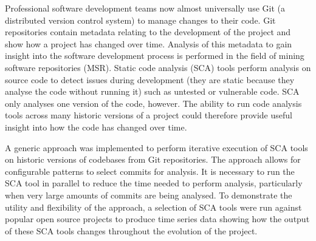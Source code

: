 Professional software development teams now almost universally use Git (a distributed version control system) to manage changes to their code.
Git repositories contain metadata relating to the development of the project and show how a project has changed over time.
Analysis of this metadata to gain insight into the software development process is performed in the field of mining software repositories (MSR).
Static code analysis (SCA) tools perform analysis on source code to detect issues during development (they are static because they analyse the code without running it) such as untested or vulnerable code.
SCA only analyses one version of the code, however.
The ability to run code analysis tools across many historic versions of a project could therefore provide useful insight into how the code has changed over time.

A generic approach was implemented to perform iterative execution of SCA tools on historic versions of codebases from Git repositories.
The approach allows for configurable patterns to select commits for analysis.
It is necessary to run the SCA tool in parallel to reduce the time needed to perform analysis, particularly when very large amounts of commits are being analysed.
To demonstrate the utility and flexibility of the approach, a selection of SCA tools were run against popular open source projects to produce time series data showing how the output of these SCA tools changes throughout the evolution of the project.
